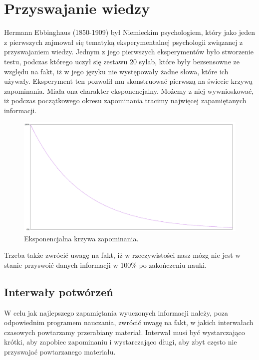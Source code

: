 {\let\cleardoublepage\relax \chapter{Przyswajanie wiedzy}}


Hermann Ebbinghaus\cite{HumanMemory} (1850-1909) był Niemieckim psychologiem, który jako jeden z pierwszych zajmował się tematyką eksperymentalnej psychologii związanej z przyswajaniem wiedzy. 
Jednym z jego pierwszych eksperymentów było stworzenie testu, podczas którego uczył się zestawu 20 sylab, które były bezsensowne ze względu na fakt, iż w jego języku nie występowały żadne słowa, które ich używały.
Eksperyment ten pozwolił mu skonstruować pierwszą na świecie krzywą zapominania. Miała ona charakter eksponencjalny.  Możemy z niej wywnioskować, iż podczas początkowego okresu zapominania tracimy najwięcej zapamiętanych informacji.

\begin{figure}[h]
	\centering
	\includegraphics[width=\textwidth]{images/curve.png}
	 \caption{Eksponencjalna krzywa zapominania.}
\end{figure}

Trzeba także zwrócić uwagę na fakt, iż w rzeczywistości\cite{ForgettingCurve} nasz mózg nie jest w stanie przyswoić danych informacji w 100\% po zakończeniu nauki. 

\section{Interwały potwórzeń}

W celu jak najlepszego zapamiętania wyuczonych informacji należy, poza odpowiednim programem nauczania, zwrócić uwagę na fakt, w jakich interwałach czasowych powtarzamy przerabiany materiał\cite{ForgettingCurve}.
Interwał musi być wystarczająco krótki, aby zapobiec zapominaniu i wystarczająco długi, aby zbyt często nie przyswajać powtarzanego materiału.



